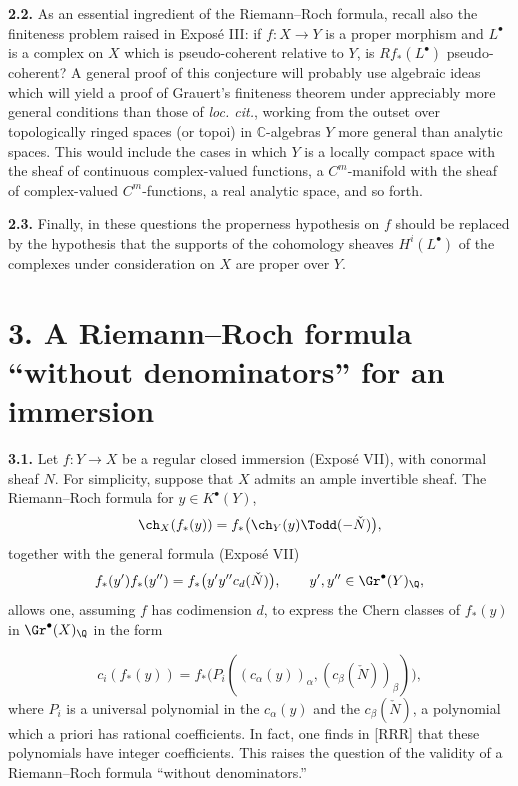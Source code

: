 \textbf{2.2.} As an essential ingredient of the Riemann--Roch formula, recall also the finiteness problem raised in Expos\'e III: if $f:X\to Y$ is a proper morphism and $L^\bullet$ is a complex on $X$ which is pseudo-coherent relative to $Y$, is $Rf_*(L^\bullet)$ pseudo-coherent? A general proof of this conjecture will probably use algebraic ideas which will yield a proof of Grauert's finiteness theorem under appreciably more general conditions than those of \emph{loc. cit.}, working from the outset over topologically ringed spaces (or topoi) in $\mathbb C$-algebras $Y$ more general than analytic spaces. This would include the cases in which $Y$ is a locally compact space with the sheaf of continuous complex-valued functions, a $C^m$-manifold with the sheaf of complex-valued $C^m$-functions, a real analytic space, and so forth.

\textbf{2.3.} Finally, in these questions the properness hypothesis on $f$ should be replaced by the hypothesis that the supports of the cohomology sheaves $H^i(L^\bullet)$ of the complexes under consideration on $X$ are proper over $Y$.

\section*{3. A Riemann--Roch formula ``without denominators'' for an immersion}

\textbf{3.1.} Let $f:Y\to X$ be a regular closed immersion (Expos\'e VII), with conormal sheaf $N$. For simplicity, suppose that $X$ admits an ample invertible sheaf. The Riemann--Roch formula for $y\in K^\bullet(Y)$,
\[
  \ch_X(f_*(y))
  =f_*\bigl(\ch_Y(y)\Todd(-\check N)\bigr),
\]
together with the general formula (Expos\'e VII)
\[
  f_*(y')f_*(y'')
  =f_*\bigl(y'y''c_d(\check N)\bigr),
  \qquad y',y''\in\Gr^\bullet(Y)_{\Q},
\]
allows one, assuming $f$ has codimension $d$, to express the Chern classes of $f_*(y)$ in $\Gr^\bullet(X)_{\Q}$ in the form

\begin{equation}\tag{3.1}
  c_i(f_*(y))
  =f_*\bigl(P_i((c_\alpha(y))_\alpha,(c_\beta(\check N))_\beta)\bigr),
\end{equation}
where $P_i$ is a universal polynomial in the $c_\alpha(y)$ and the $c_\beta(\check N)$, a polynomial which a priori has rational coefficients. In fact, one finds in [RRR] that these polynomials have integer coefficients. This raises the question of the validity of a Riemann--Roch formula ``without denominators.''

